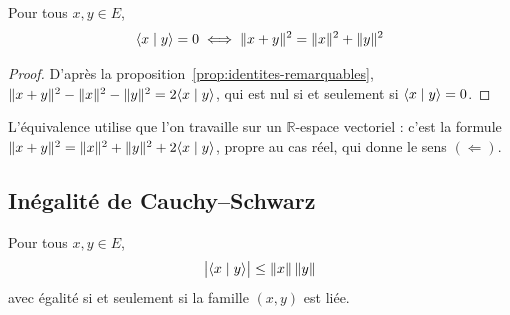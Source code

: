\begin{theo}
\label{theo:pythagore-2}
Pour tous $x,y\in E$,
\[\langle x\mid y\rangle=0\iff\|x+y\|^2=\|x\|^2+\|y\|^2\]
\end{theo}

\begin{proof}
D'après la proposition~\ref{prop:identites-remarquables}, $\|x+y\|^2-\|x\|^2-\|y\|^2=2\langle x\mid y\rangle$, qui est nul si et seulement si $\langle x\mid y\rangle=0$.
\end{proof}

\begin{remarque}
L'équivalence utilise que l'on travaille sur un $\mathbb{R}$-espace vectoriel : c'est la formule $\|x+y\|^2=\|x\|^2+\|y\|^2+2\langle x\mid y\rangle$, propre au cas réel, qui donne le sens $(\Leftarrow)$.
\end{remarque}

\subsection{Inégalité de Cauchy--Schwarz}

\begin{theo}
\label{theo:cauchy-schwarz}
Pour tous $x,y\in E$,
\[\big|\langle x\mid y\rangle\big|\leq\|x\|\,\|y\|\]
avec égalité si et seulement si la famille $(x,y)$ est liée.
\end{theo}

